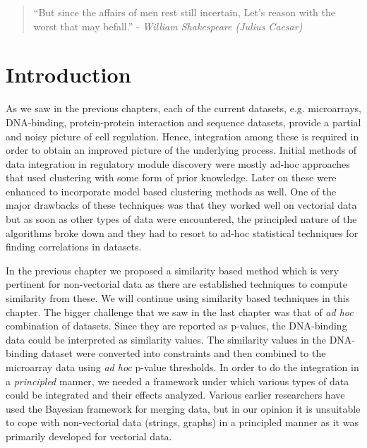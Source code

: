 \begin{quote} ``But since the affairs of men rest still incertain, Let's reason with the worst that may befall.'' - \textit{William Shakespeare (Julius Caesar)}\end{quote} 
\section{Introduction}
As we saw in the previous chapters, each of the current datasets, e.g. microarrays, DNA-binding, protein-protein interaction and sequence datasets, provide a partial 
and noisy picture of cell regulation. Hence, integration among these is required in order to obtain an improved picture of the underlying process. Initial methods 
of data integration in regulatory module discovery were mostly ad-hoc approaches that used clustering with some form of prior knowledge. Later on these were 
enhanced to incorporate model based clustering methods as well. One of the major drawbacks of these techniques was that they worked well on vectorial data but as 
soon as other types of data were encountered, the principled nature of the algorithms broke down and they had to resort to ad-hoc statistical techniques for finding 
correlations in datasets.

In the previous chapter we proposed a similarity based method which is very pertinent for non-vectorial data as there are established techniques to compute similarity 
from these. We will continue using similarity based techniques in this chapter. The bigger challenge that we saw in the last chapter was that of 
\textit{ad hoc} combination of datasets. Since they are reported as p-values, the DNA-binding data could be interpreted as similarity values. 
The similarity values in the DNA-binding dataset were converted into constraints and then combined to the microarray data using \textit{ad hoc} p-value thresholds. 
In order to do the integration in a \textit{principled} manner, we needed a framework under which various types of data could be integrated and their effects analyzed. 
Various earlier researchers have used the Bayesian framework for merging data, but in our opinion it is unsuitable to cope with non-vectorial data (strings, graphs) 
in a principled manner as it was primarily developed for vectorial data. 

